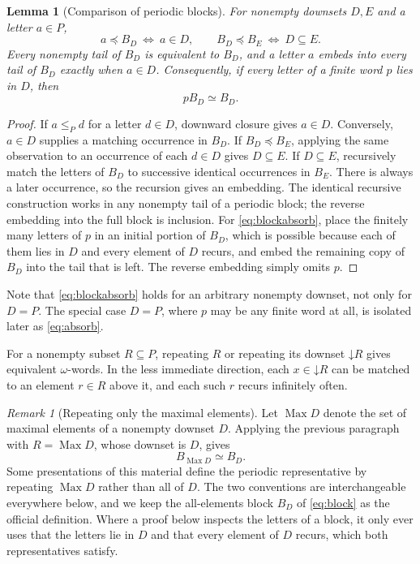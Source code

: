 \documentclass[11pt,a4paper]{article}
\numberwithin{equation}{section}
\newtheorem{lemma}[theorem]{Lemma}
\theoremstyle{definition}
\theoremstyle{remark}
\newtheorem{remark}[theorem]{Remark}
\newcommand{\down}{\mathord{\downarrow}}
\newcommand{\emb}{\preccurlyeq}
\newcommand{\eqv}{\simeq}
\newcommand{\Max}{\operatorname{Max}}
\begin{document}
\begin{lemma}[Comparison of periodic blocks]\label{lem:blocks}
For nonempty downsets $D,E$ and a letter $a\in P$,
\[
 a\emb B_D\ \Longleftrightarrow\ a\in D,
 \qquad
 B_D\emb B_E\ \Longleftrightarrow\ D\subseteq E.
\]
Every nonempty tail of $B_D$ is equivalent to $B_D$, and a letter $a$ embeds
into every tail of $B_D$ exactly when $a\in D$. Consequently, if every letter
of a finite word $p$ lies in $D$, then
\begin{equation}\label{eq:blockabsorb}
 pB_D\eqv B_D.
\end{equation}
\end{lemma}
\begin{proof}
If $a\le_P d$ for a letter $d\in D$, downward closure gives $a\in D$.
Conversely, $a\in D$ supplies a matching occurrence in $B_D$. If
$B_D\emb B_E$, applying the same observation to an occurrence of each
$d\in D$ gives $D\subseteq E$. If $D\subseteq E$, recursively match the
letters of $B_D$ to successive identical occurrences in $B_E$. There is
always a later occurrence, so the recursion gives an embedding.
The identical recursive construction works in any nonempty tail of a
periodic block; the reverse embedding into the full block is inclusion.
For \eqref{eq:blockabsorb}, place the finitely many letters of $p$ in an
initial portion of $B_D$, which is possible because each of them lies in $D$
and every element of $D$ recurs, and embed the remaining copy of $B_D$ into
the tail that is left. The reverse embedding simply omits $p$.
\end{proof}

Note that \eqref{eq:blockabsorb} holds for an arbitrary nonempty downset, not
only for $D=P$. The special case $D=P$, where $p$ may be any finite word at
all, is isolated later as \eqref{eq:absorb}.

For a nonempty subset $R\subseteq P$, repeating $R$ or repeating its downset
$\down R$ gives equivalent $\omega$-words. In the less immediate direction,
each $x\in\down R$ can be matched to an element $r\in R$ above it, and each
such $r$ recurs infinitely often.

\begin{remark}[Repeating only the maximal elements]\label{rem:maxblock}
Let $\Max D$ denote the set of maximal elements of a nonempty downset $D$.
Applying the previous paragraph with $R=\Max D$, whose downset is $D$, gives
\[
 B_{\Max D}\eqv B_D .
\]
Some presentations of this material define the periodic representative by
repeating $\Max D$ rather than all of $D$. The two conventions are
interchangeable everywhere below, and we keep the all-elements block $B_D$ of
\eqref{eq:block} as the official definition. Where a proof below inspects the
letters of a block, it only ever uses that the letters lie in $D$ and that
every element of $D$ recurs, which both representatives satisfy.
\end{remark}
\end{document}
